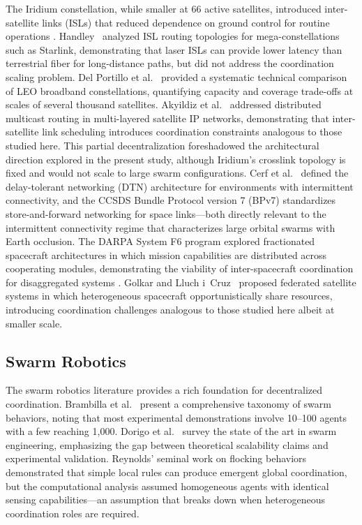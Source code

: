 \documentclass[journal]{IEEEtran}
\begin{document}
The Iridium constellation, while smaller at 66 active satellites, introduced inter-satellite links (ISLs) that reduced dependence on ground control for routine operations \cite{iridium_arch}. Handley~\cite{handley_2018} analyzed ISL routing topologies for mega-constellations such as Starlink, demonstrating that laser ISLs can provide lower latency than terrestrial fiber for long-distance paths, but did not address the coordination scaling problem. Del Portillo et al.~\cite{del_portillo_mega} provided a systematic technical comparison of LEO broadband constellations, quantifying capacity and coverage trade-offs at scales of several thousand satellites. Akyildiz et al.~\cite{akyildiz_isl} addressed distributed multicast routing in multi-layered satellite IP networks, demonstrating that inter-satellite link scheduling introduces coordination constraints analogous to those studied here. This partial decentralization foreshadowed the architectural direction explored in the present study, although Iridium's crosslink topology is fixed and would not scale to large swarm configurations. Cerf et al.~\cite{cerf_dtn} defined the delay-tolerant networking (DTN) architecture for environments with intermittent connectivity, and the CCSDS Bundle Protocol version 7 (BPv7) \cite{ccsds_bpv7} standardizes store-and-forward networking for space links---both directly relevant to the intermittent connectivity regime that characterizes large orbital swarms with Earth occlusion. The DARPA System F6 program explored fractionated spacecraft architectures in which mission capabilities are distributed across cooperating modules, demonstrating the viability of inter-spacecraft coordination for disaggregated systems \cite{darpa_f6}. Golkar and Lluch i~Cruz~\cite{golkar_federated} proposed federated satellite systems in which heterogeneous spacecraft opportunistically share resources, introducing coordination challenges analogous to those studied here albeit at smaller scale.

\subsection{Swarm Robotics}

The swarm robotics literature provides a rich foundation for decentralized coordination. Brambilla et al.~\cite{brambilla_2013} present a comprehensive taxonomy of swarm behaviors, noting that most experimental demonstrations involve 10--100 agents with a few reaching 1{,}000. Dorigo et al.~\cite{dorigo_2021} survey the state of the art in swarm engineering, emphasizing the gap between theoretical scalability claims and experimental validation. Reynolds' seminal work on flocking behaviors \cite{reynolds_1987} demonstrated that simple local rules can produce emergent global coordination, but the computational analysis assumed homogeneous agents with identical sensing capabilities---an assumption that breaks down when heterogeneous coordination roles are required.
\end{document}
